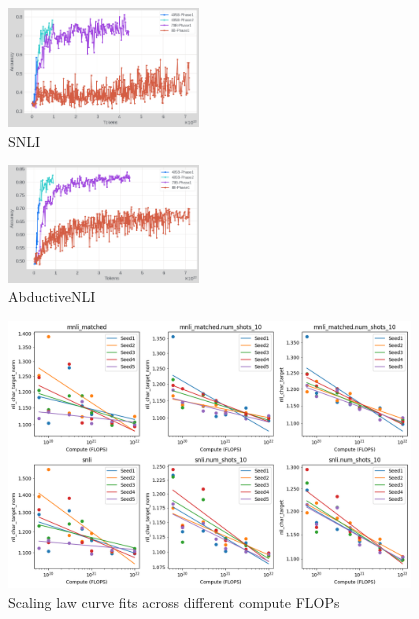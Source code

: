 \begin{figure}[t]
    \centering
    \includegraphics[width=0.45\textwidth]{nli_plots/snli_intermediate.png}
    \caption{SNLI}
    \label{fig:snli_int}
\end{figure}

\begin{figure}[t]
    \centering
    \includegraphics[width=0.45\textwidth]{nli_plots/abductivenli_intermediate.png}
    \caption{AbductiveNLI}
    \label{fig:abductivenli_int}
\end{figure}

\begin{figure}[ht]
    \centering
    \includegraphics[width=0.95\textwidth]{nli_plots/sl_fits_mnli_snli.png}
    \caption{Scaling law curve fits across different compute FLOPs}
    \label{fig:sl_mnli_snli}
\end{figure}

